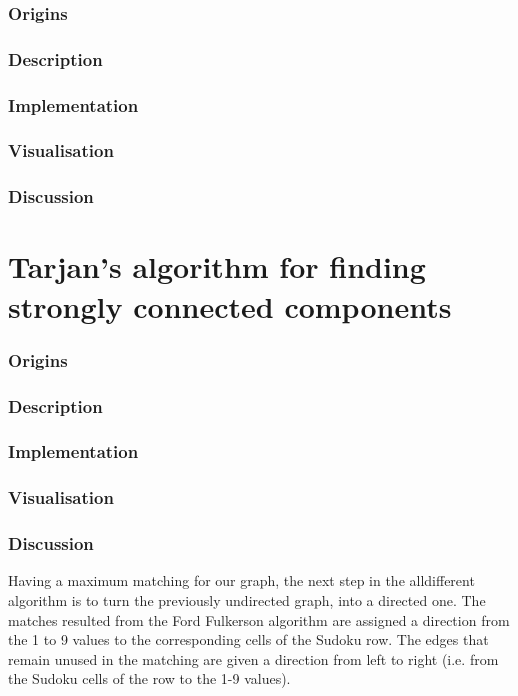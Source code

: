 \documentclass{l4proj}
\begin{document}
\subsubsection{Origins}

\subsubsection{Description}

\subsubsection{Implementation}

\subsubsection{Visualisation}

\subsubsection{Discussion}

\section{Tarjan's algorithm for finding strongly connected components}

\subsubsection{Origins}

\subsubsection{Description}

\subsubsection{Implementation}

\subsubsection{Visualisation}

\subsubsection{Discussion}

Having a maximum matching for our graph, the next step in the alldifferent algorithm is to turn the previously undirected graph, into a directed one. The matches resulted from the Ford Fulkerson algorithm are assigned a direction from the 1 to 9 values to the corresponding cells of the Sudoku row. The edges that remain unused in the matching are given a direction from left to right (i.e. from the Sudoku cells of the row to the 1-9 values).
\end{document}
